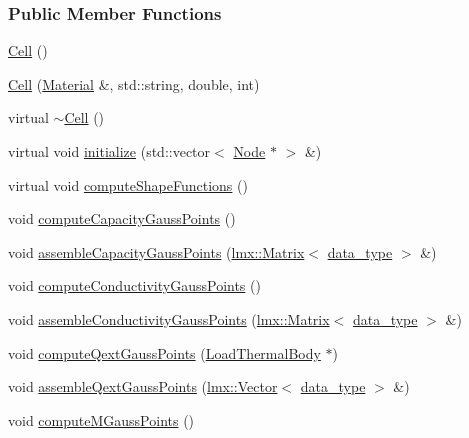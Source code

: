 \subsubsection*{Public Member Functions}
\begin{DoxyCompactItemize}
\item 
\hyperlink{classmknix_1_1_cell_a1c285cc4f38656550e8e2926058e8612}{Cell} ()
\item 
\hyperlink{classmknix_1_1_cell_ad0988ed8a4aac7c7440bee9413e1189f}{Cell} (\hyperlink{classmknix_1_1_material}{Material} \&, std\+::string, double, int)
\item 
virtual \hyperlink{classmknix_1_1_cell_ab4efc3f7c10212304dd776e7b58bb57b}{$\sim$\+Cell} ()
\item 
virtual void \hyperlink{classmknix_1_1_cell_a77d7851793538f99d8aa0ea664fa0fb7}{initialize} (std\+::vector$<$ \hyperlink{classmknix_1_1_node}{Node} $\ast$ $>$ \&)
\item 
virtual void \hyperlink{classmknix_1_1_cell_a6772f09fe6965faff4b53486b09f7235}{compute\+Shape\+Functions} ()
\item 
void \hyperlink{classmknix_1_1_cell_a675db1cafb39d5abab7b13994df21045}{compute\+Capacity\+Gauss\+Points} ()
\item 
void \hyperlink{classmknix_1_1_cell_a4d4af2c299e451b91a81819ccf5d6358}{assemble\+Capacity\+Gauss\+Points} (\hyperlink{classlmx_1_1_matrix}{lmx\+::\+Matrix}$<$ \hyperlink{namespacemknix_a16be4b246fbf2cceb141e3a179111020}{data\+\_\+type} $>$ \&)
\item 
void \hyperlink{classmknix_1_1_cell_a5d8c11ba58bbaa6f70d5dc2b530868e7}{compute\+Conductivity\+Gauss\+Points} ()
\item 
void \hyperlink{classmknix_1_1_cell_aae283c2a89beb517ed41b42bfdb19957}{assemble\+Conductivity\+Gauss\+Points} (\hyperlink{classlmx_1_1_matrix}{lmx\+::\+Matrix}$<$ \hyperlink{namespacemknix_a16be4b246fbf2cceb141e3a179111020}{data\+\_\+type} $>$ \&)
\item 
void \hyperlink{classmknix_1_1_cell_a98f6864613cfbac05b0f8ccbe067e743}{compute\+Qext\+Gauss\+Points} (\hyperlink{classmknix_1_1_load_thermal_body}{Load\+Thermal\+Body} $\ast$)
\item 
void \hyperlink{classmknix_1_1_cell_a130944ac8867e93ce882e7cc8c3555ca}{assemble\+Qext\+Gauss\+Points} (\hyperlink{classlmx_1_1_vector}{lmx\+::\+Vector}$<$ \hyperlink{namespacemknix_a16be4b246fbf2cceb141e3a179111020}{data\+\_\+type} $>$ \&)
\item 
void \hyperlink{classmknix_1_1_cell_a32a01eb5f854fc23353c0eb64b65e2da}{compute\+M\+Gauss\+Points} ()

\end{DoxyCompactItemize}
